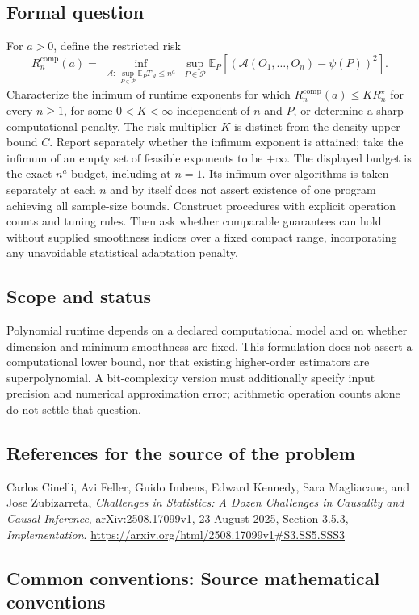 \documentclass[11pt,a4paper]{article}
\newcommand{\E}{\mathbb E}
\begin{document}
\subsection*{Formal question}
For $a>0$, define the restricted risk
\[
 R_n^{\mathrm{comp}}(a)=
 \inf_{\substack{\mathcal A:\ \sup_{P\in\mathcal P}
                             \E_P T_{\mathcal A}\leq n^a}}
 \sup_{P\in\mathcal P}
 \E_P[(\mathcal A(O_1,\ldots,O_n)-\psi(P))^2].
\]
Characterize the infimum of runtime exponents for which
$R_n^{\mathrm{comp}}(a)\leq K R_n^\star$ for every $n\geq1$, for some $0<K<\infty$ independent of $n$ and $P$, or determine a sharp computational penalty. The risk multiplier $K$ is distinct from the density upper bound $C$. Report separately whether the infimum exponent is attained; take the infimum of an empty set of feasible exponents to be $+\infty$. The displayed budget is the exact $n^a$ budget, including at $n=1$. Its infimum over algorithms is taken separately at each $n$ and by itself does not assert existence of one program achieving all sample-size bounds. Construct procedures with explicit operation counts and tuning rules. Then ask whether comparable guarantees can hold without supplied smoothness indices over a fixed compact range, incorporating any unavoidable statistical adaptation penalty.
\subsection*{Scope and status}
Polynomial runtime depends on a declared computational model and on whether dimension and minimum smoothness are fixed. This formulation does not assert a computational lower bound, nor that existing higher-order estimators are superpolynomial. A bit-complexity version must additionally specify input precision and numerical approximation error; arithmetic operation counts alone do not settle that question.
\subsection*{References for the source of the problem}
Carlos Cinelli, Avi Feller, Guido Imbens, Edward Kennedy, Sara Magliacane, and Jose Zubizarreta, \emph{Challenges in Statistics: A Dozen Challenges in Causality and Causal Inference}, arXiv:2508.17099v1, 23 August 2025, Section 3.5.3, \emph{Implementation}.
\url{https://arxiv.org/html/2508.17099v1#S3.SS5.SSS3}

\subsection*{Common conventions: Source mathematical conventions}
\end{document}
